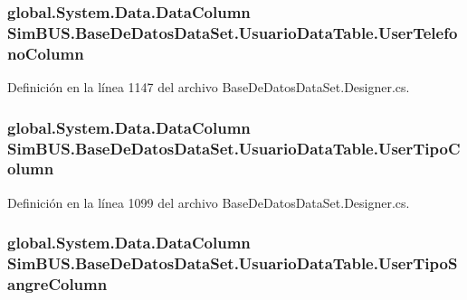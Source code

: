 \subsubsection[{User\-Telefono\-Column}]{\setlength{\rightskip}{0pt plus 5cm}global.\-System.\-Data.\-Data\-Column Sim\-B\-U\-S.\-Base\-De\-Datos\-Data\-Set.\-Usuario\-Data\-Table.\-User\-Telefono\-Column\hspace{0.3cm}{\ttfamily [get]}}\label{class_sim_b_u_s_1_1_base_de_datos_data_set_1_1_usuario_data_table_a54e88d72b2e3567bd60a60a85a2c7d61}


Definición en la línea 1147 del archivo Base\-De\-Datos\-Data\-Set.\-Designer.\-cs.

\subsubsection[{User\-Tipo\-Column}]{\setlength{\rightskip}{0pt plus 5cm}global.\-System.\-Data.\-Data\-Column Sim\-B\-U\-S.\-Base\-De\-Datos\-Data\-Set.\-Usuario\-Data\-Table.\-User\-Tipo\-Column\hspace{0.3cm}{\ttfamily [get]}}\label{class_sim_b_u_s_1_1_base_de_datos_data_set_1_1_usuario_data_table_a12e08f493cba8d0ef0eb0c4c94e5bacf}


Definición en la línea 1099 del archivo Base\-De\-Datos\-Data\-Set.\-Designer.\-cs.

\subsubsection[{User\-Tipo\-Sangre\-Column}]{\setlength{\rightskip}{0pt plus 5cm}global.\-System.\-Data.\-Data\-Column Sim\-B\-U\-S.\-Base\-De\-Datos\-Data\-Set.\-Usuario\-Data\-Table.\-User\-Tipo\-Sangre\-Column\hspace{0.3cm}{\ttfamily [get]}}\label{class_sim_b_u_s_1_1_base_de_datos_data_set_1_1_usuario_data_table_a4185e01ea72ccf98bc2893e54fa0c8b0}


